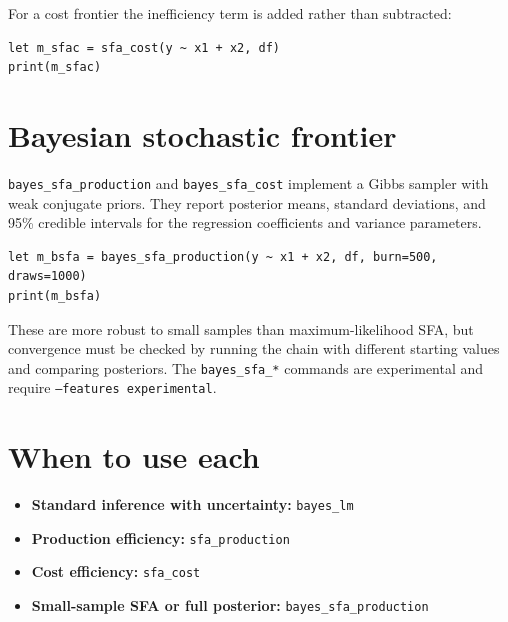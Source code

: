 For a cost frontier the inefficiency term is added rather than
subtracted:

\begin{lstlisting}[caption={Stochastic cost frontier}]
let m_sfac = sfa_cost(y ~ x1 + x2, df)
print(m_sfac)
\end{lstlisting}

\section{Bayesian stochastic frontier}

\texttt{bayes\_sfa\_production} and \texttt{bayes\_sfa\_cost} implement a Gibbs sampler
with weak conjugate priors. They report posterior means, standard
deviations, and 95\% credible intervals for the regression coefficients
and variance parameters.

\begin{lstlisting}[caption={Bayesian SFA}]
let m_bsfa = bayes_sfa_production(y ~ x1 + x2, df, burn=500, draws=1000)
print(m_bsfa)
\end{lstlisting}

These are more robust to small samples than maximum-likelihood SFA, but
convergence must be checked by running the chain with different starting
values and comparing posteriors. The \texttt{bayes\_sfa\_*} commands are
experimental and require \texttt{--features experimental}.

\section{When to use each}

\begin{itemize}
\item \textbf{Standard inference with uncertainty:} \texttt{bayes\_lm}
\item \textbf{Production efficiency:} \texttt{sfa\_production}
\item \textbf{Cost efficiency:} \texttt{sfa\_cost}
\item \textbf{Small-sample SFA or full posterior:} \texttt{bayes\_sfa\_production}
\end{itemize}
